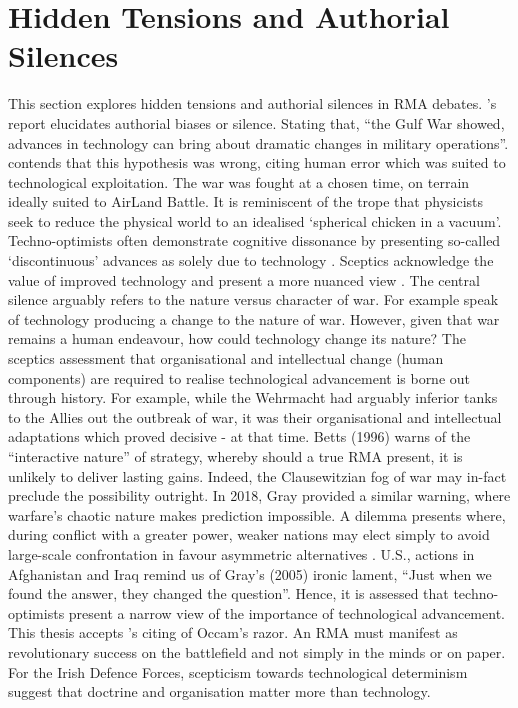 \section{Hidden Tensions and Authorial Silences}


This section explores hidden tensions and authorial silences in RMA debates. \textcite{HUNDLEY_1999}'s report elucidates authorial biases or silence. Stating that, ``the Gulf War showed, advances in technology can bring about dramatic changes in military operations''.  \textcite{BIDDLE_1996} contends that this hypothesis was wrong, citing human error which was suited to technological exploitation. The war was fought at a chosen time, on terrain ideally suited to AirLand Battle. It is reminiscent of the trope that physicists seek to reduce the physical world to an idealised `spherical chicken in a vacuum'. Techno-optimists often demonstrate cognitive dissonance by presenting so-called `discontinuous' advances as solely due to technology \parencite{HUNDLEY_1999,KREPINEVICH_1992,KREPINEVICH_1994,KREPINEVICH_1996,OWENS_1996,OWENS_2000,OWENS_2002,COHEN_1995,COHEN_1996}. Sceptics acknowledge the value of improved technology and present a more nuanced view \parencite{BETTS_1996,BROSE_2019,GRAY_2005,ALACH_2008A}. The central silence arguably refers to the nature versus character of war. For example \textcite{HUNDLEY_1999,KREPINEVICH_1992} speak of technology producing a change to the nature of war. However, given that war remains a human endeavour, how could technology change its nature? The sceptics assessment that organisational and intellectual change (human components) are required to realise technological advancement is borne out through history. For example, while the Wehrmacht had arguably inferior tanks to the Allies out the outbreak of war, it was their organisational and intellectual adaptations which proved decisive - at that time. Betts (1996) warns of the ``interactive nature'' of strategy, whereby should a true RMA present, it is unlikely to deliver lasting gains\nocite{BETTS_1996}. Indeed, the Clausewitzian fog of war may in-fact preclude the possibility outright. In 2018, Gray provided a similar warning, \nocite{GRAY_2005,GRAY_2018} where warfare's chaotic nature makes prediction impossible. A dilemma presents where, during conflict with a greater power, weaker nations may elect simply to avoid large-scale confrontation in favour asymmetric alternatives \parencite{JORD_2003}. U.S., actions in Afghanistan and Iraq remind us of Gray's (2005) ironic lament, ``Just when we found the answer, they changed the question''\nocite{GRAY_2005}. Hence, it is assessed that techno-optimists present a narrow view of the importance of technological advancement. This thesis accepts \textcite{ALACH_2008A}'s citing of Occam's razor. An RMA must manifest as revolutionary success on the battlefield and not simply in the minds or on paper. For the Irish Defence Forces, scepticism towards technological determinism suggest that doctrine and organisation matter more than technology.

